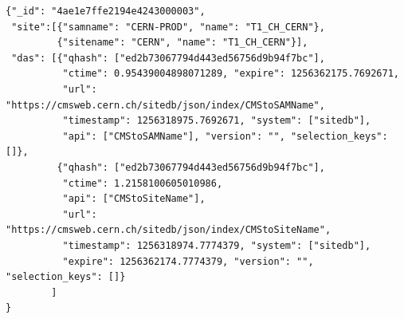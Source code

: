 \documentclass[a4paper]{jpconf}
\begin{document}
\begin{verbatim}
{"_id": "4ae1e7ffe2194e4243000003", 
 "site":[{"samname": "CERN-PROD", "name": "T1_CH_CERN"}, 
         {"sitename": "CERN", "name": "T1_CH_CERN"}], 
 "das": [{"qhash": ["ed2b73067794d443ed56756d9b94f7bc"], 
          "ctime": 0.95439004898071289, "expire": 1256362175.7692671, 
          "url": "https://cmsweb.cern.ch/sitedb/json/index/CMStoSAMName", 
          "timestamp": 1256318975.7692671, "system": ["sitedb"], 
          "api": ["CMStoSAMName"], "version": "", "selection_keys": []}, 
         {"qhash": ["ed2b73067794d443ed56756d9b94f7bc"], 
          "ctime": 1.2158100605010986, 
          "api": ["CMStoSiteName"], 
          "url": "https://cmsweb.cern.ch/sitedb/json/index/CMStoSiteName", 
          "timestamp": 1256318974.7774379, "system": ["sitedb"], 
          "expire": 1256362174.7774379, "version": "", "selection_keys": []}
        ]
}
\end{verbatim}

\end{document}
